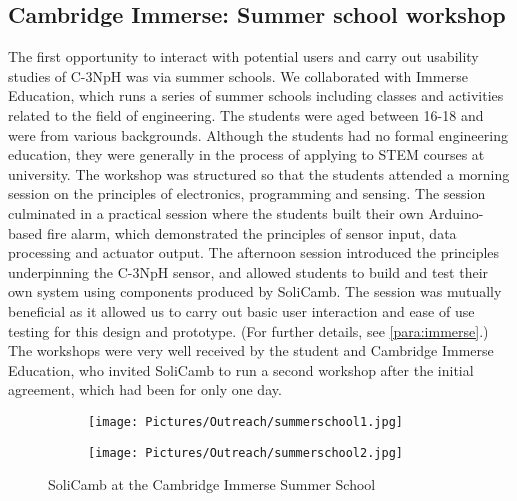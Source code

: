 \subsection{Cambridge Immerse: Summer school workshop }

        The first opportunity to interact with potential users and carry out usability studies of C-3NpH was via summer schools. We collaborated with Immerse Education,  which runs a series of summer schools including classes and activities related to the field of engineering. The students were aged between 16-18 and were from various backgrounds. Although the students had no formal engineering education, they were generally in the process of applying to \gls{STEM} courses at university.
        The workshop was structured so that the students attended a morning session on the principles of electronics, programming and sensing. The session culminated in a practical session where the students built their own Arduino-based fire alarm, which demonstrated the principles of sensor input, data processing and actuator output.
        The afternoon session introduced the principles underpinning the C-3NpH sensor, and allowed students to build and test their own system using components produced by SoliCamb. The session was mutually beneficial as it allowed us to carry out basic user interaction and ease of use testing for this design and prototype. (For further details, see \cref{para:immerse}.)
        The workshops were very well received by the student and Cambridge Immerse Education, who invited SoliCamb to run a second workshop after the initial agreement, which had been for only one day. %
        
   \begin{figure}[ht]
	\centering
	\begin{subfigure}[b]{0.45\linewidth} 
		\centering
		\texttt{[image: Pictures/Outreach/summerschool1.jpg]}
	\end{subfigure}
	\begin{subfigure}[b]{0.45\linewidth}
		\texttt{[image: Pictures/Outreach/summerschool2.jpg]}
	\end{subfigure}
	\caption{SoliCamb at the Cambridge Immerse Summer School}
	\label{fig:immerse}
\end{figure}  

